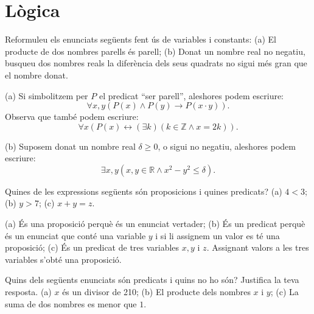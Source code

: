 

\section{L\`{o}gica}

\begin{exer}
Reformuleu els enunciats seg\"{u}ents fent \'{u}s de variables i constants:
(a) El producte de dos nombres parells \'{e}s parell; (b) Donat un nombre real
no negatiu, busqueu dos nombres reals la difer\`{e}ncia dels seus quadrats no
sigui m\'{e}s gran que el nombre donat.
\end{exer}

\begin{solucio}
(a) Si simbolitzem per $P$ el predicat \textquotedblleft ser
parell\textquotedblright, aleshores podem escriure:%
\[
\forall x,y\left(  P\left(  x\right)  \wedge P\left(  y\right)
\longrightarrow P\left(  x\cdot y\right)  \right)  \text{.}%
\]
Observa que tamb\'{e} podem escriure:%
\[
\forall x\left(  P\left(  x\right)  \longleftrightarrow\left(  \exists
k\right)  \left(  k\in\mathbb{Z}\wedge x=2k\right)  \right)  \text{.}%
\]


(b) Suposem donat un nombre real $\delta\geq0$, o sigui no negatiu, aleshores
podem escriure:%
\[
\exists x,y\left(  x,y\in\mathbb{R}\wedge x^{2}-y^{2}\leq\delta\right)
\text{.}%
\]

\end{solucio}

\begin{exer}
Quines de les expressions seg\"{u}ents s\'{o}n proposicions i quines
predicats? (a) $4<3$; (b) $y>7$; (c) $x+y=z$.
\end{exer}

\begin{solucio}
(a) \'{E}s una proposici\'{o} perqu\`{e} \'{e}s un enunciat vertader; (b)
\'{E}s un predicat perqu\`{e} \'{e}s un enunciat que cont\'{e} una variable
$y$ i si li assignem un valor es t\'{e} una proposici\'{o}; (c) \'{E}s un
predicat de tres variables $x,y$ i $z$. Assignant valors a les tres variables
s'obt\'{e} una proposici\'{o}.
\end{solucio}

\begin{exer}
Quins dels seg\"{u}ents enunciats s\'{o}n predicats i quins no ho s\'{o}n?
Justifica la teva resposta. (a) $x$ \'{e}s un divisor de 210; (b) El producte
dels nombres $x$ i $y$; (c) La suma de dos nombres es menor que $1$.
\end{exer}

